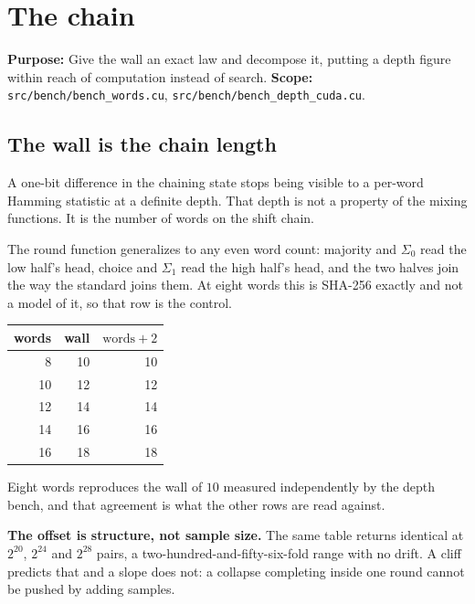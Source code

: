 \chapter{The chain}

\textbf{Purpose:} Give the wall an exact law and decompose it, putting a depth figure within reach of computation instead of search. \textbf{Scope:} \texttt{src/\allowbreak{}bench/\allowbreak{}bench\_\allowbreak{}words.\allowbreak{}cu}, \texttt{src/\allowbreak{}bench/\allowbreak{}bench\_\allowbreak{}depth\_\allowbreak{}cuda.\allowbreak{}cu}.

\section{The wall is the chain length}

A one-bit difference in the chaining state stops being visible to a per-word Hamming statistic at a definite depth. That depth is not a property of the mixing functions. It is the number of words on the shift chain.

The round function generalizes to any even word count: majority and \(\Sigma_0\) read the low half's head, choice and \(\Sigma_1\) read the high half's head, and the two halves join the way the standard joins them. At eight words this is SHA-256 exactly and not a model of it, so that row is the control.

\begin{center}
\begin{tabular}{rrr}
\toprule
words & wall & \(\text{words} + 2\) \\
\midrule
8 & 10 & 10 \\
10 & 12 & 12 \\
12 & 14 & 14 \\
14 & 16 & 16 \\
16 & 18 & 18 \\
\bottomrule
\end{tabular}
\end{center}

Eight words reproduces the wall of \(10\) measured independently by the depth bench, and that agreement is what the other rows are read against.

\textbf{The offset is structure, not sample size.} The same table returns identical at \(2^{20}\), \(2^{24}\) and \(2^{28}\) pairs, a two-hundred-and-fifty-six-fold range with no drift. A cliff predicts that and a slope does not: a collapse completing inside one round cannot be pushed by adding samples.

